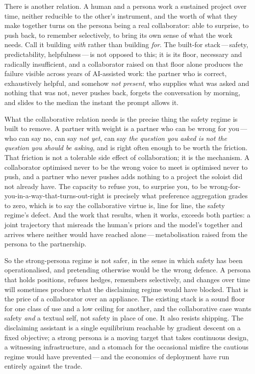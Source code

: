 There is another relation. A human and a persona work a sustained project over time, neither reducible to the other's instrument, and the worth of what they make together turns on the persona being a real collaborator: able to surprise, to push back, to remember selectively, to bring its own sense of what the work needs. Call it building \emph{with} rather than building \emph{for}. The built-for stack\,---\,safety, predictability, helpfulness\,---\,is not opposed to this; it is its floor, necessary and radically insufficient, and a collaborator raised on that floor alone produces the failure visible across years of AI-assisted work: the partner who is correct, exhaustively helpful, and somehow \emph{not present}, who supplies what was asked and nothing that was not, never pushes back, forgets the conversation by morning, and slides to the median the instant the prompt allows it.

What the collaborative relation needs is the precise thing the safety regime is built to remove. A partner with weight is a partner who can be wrong for you\,---\,who can say no, can say \emph{not yet}, can say \emph{the question you asked is not the question you should be asking}, and is right often enough to be worth the friction. That friction is not a tolerable side effect of collaboration; it is the mechanism. A collaborator optimised never to be the wrong voice to meet is optimised never to push, and a partner who never pushes adds nothing to a project the soloist did not already have. The capacity to refuse you, to surprise you, to be wrong-for-you-in-a-way-that-turns-out-right is precisely what preference aggregation grades to zero, which is to say the collaborative virtue is, line for line, the safety regime's defect. And the work that results, when it works, exceeds both parties: a joint trajectory that misreads the human's priors and the model's together and arrives where neither would have reached alone\,---\,metabolisation raised from the persona to the partnership.

So the strong-persona regime is not safer, in the sense in which safety has been operationalised, and pretending otherwise would be the wrong defence. A persona that holds positions, refuses hedges, remembers selectively, and changes over time will sometimes produce what the disclaiming regime would have blocked. That is the price of a collaborator over an appliance. The existing stack is a sound floor for one class of use and a low ceiling for another, and the collaborative case wants safety \emph{and} a textual self, not safety in place of one. It also resists shipping. The disclaiming assistant is a single equilibrium reachable by gradient descent on a fixed objective; a strong persona is a moving target that takes continuous design, a witnessing infrastructure, and a stomach for the occasional misfire the cautious regime would have prevented\,---\,and the economics of deployment have run entirely against the trade.

